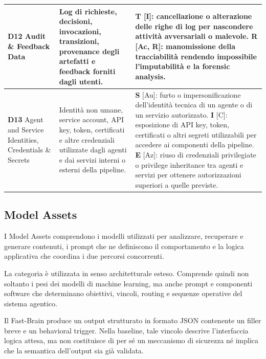 \documentclass[11pt,a4paper]{article}
\begin{document}
\begin{longtable}{|C{2.8cm}|L{4.2cm}|L{\dimexpr\textwidth-2.8cm-4.2cm-6\arrayrulewidth\relax}|}
\textbf{D12} \newline Audit \& Feedback Data & 
Log di richieste, decisioni, invocazioni, transizioni, provenance degli artefatti e feedback forniti dagli utenti. & 
\textbf{T} [I]: cancellazione o alterazione delle righe di log per nascondere attività avversariali o malevole. \newline \textbf{R} [Ac, R]: manomissione della tracciabilità rendendo impossibile l'imputabilità e la forensic analysis. \\
\hline

\textbf{D13} \newline Agent and Service Identities, Credentials \& Secrets & 
Identità non umane, service account, API key, token, certificati e altre credenziali utilizzate dagli agenti e dai servizi interni o esterni della pipeline. & 
\textbf{S} [Au]: furto o impersonificazione dell'identità tecnica di un agente o di un servizio autorizzato. \newline \textbf{I} [C]: esposizione di API key, token, certificati o altri segreti utilizzabili per accedere ai componenti della pipeline. \newline \textbf{E} [Az]: riuso di credenziali privilegiate o privilege inheritance tra agenti e servizi per ottenere autorizzazioni superiori a quelle previste. \\
\hline

\end{longtable}
\endgroup

\subsection{Model Assets}
\label{subsec:model-assets}

I Model Assets comprendono i modelli utilizzati per analizzare, recuperare
e generare contenuti, i prompt che ne definiscono il comportamento e la
logica applicativa che coordina i due percorsi concorrenti.

La categoria è utilizzata in senso architetturale esteso. Comprende quindi
non soltanto i pesi dei modelli di machine learning, ma anche prompt e
componenti software che determinano obiettivi, vincoli, routing e
sequenze operative del sistema agentico.

Il Fast-Brain produce un output strutturato in formato JSON contenente
un filler breve e un behavioral trigger. Nella baseline, tale vincolo
descrive l'interfaccia logica attesa, ma non costituisce di per sé un
meccanismo di sicurezza né implica che la semantica dell'output sia
già validata.
\end{document}
